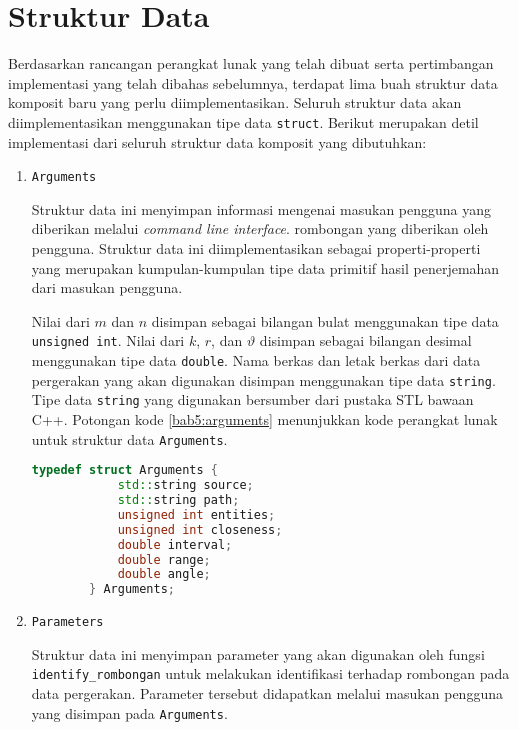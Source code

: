 \section{Struktur Data}
\label{sec:impl-struct}

Berdasarkan rancangan perangkat lunak yang telah dibuat serta pertimbangan implementasi yang telah dibahas sebelumnya, terdapat lima buah struktur data komposit baru yang perlu diimplementasikan. Seluruh struktur data akan diimplementasikan menggunakan tipe data \texttt{struct}. Berikut merupakan detil implementasi dari seluruh struktur data komposit yang dibutuhkan:



\begin{enumerate}
    \item \texttt{Arguments}
    
    Struktur data ini menyimpan informasi mengenai masukan pengguna yang diberikan melalui \textit{command line interface}. rombongan yang diberikan oleh pengguna. Struktur data ini diimplementasikan sebagai properti-properti yang merupakan kumpulan-kumpulan tipe data primitif hasil penerjemahan dari masukan pengguna.
    
    Nilai dari $m$ dan $n$ disimpan sebagai bilangan bulat menggunakan tipe data \texttt{unsigned int}. Nilai dari $k$, $r$, dan $\vartheta$ disimpan sebagai bilangan desimal menggunakan tipe data \texttt{double}. Nama berkas dan letak berkas dari data pergerakan yang akan digunakan disimpan menggunakan tipe data \texttt{string}. Tipe data \texttt{string} yang digunakan bersumber dari pustaka STL bawaan C++. Potongan kode \ref{bab5:arguments} menunjukkan kode perangkat lunak untuk struktur data \texttt{Arguments}. 
    
    \begin{lstlisting}[language=C++, caption=Implementasi \texttt{Arguments}, label={bab5:arguments}]
        typedef struct Arguments {
            std::string source;
            std::string path;
            unsigned int entities;
            unsigned int closeness;
            double interval;
            double range;
            double angle;
        } Arguments;
    \end{lstlisting}
    
    \item \texttt{Parameters}
    
    Struktur data ini menyimpan parameter yang akan digunakan oleh fungsi \texttt{identify\_rombongan} untuk melakukan identifikasi terhadap rombongan pada data pergerakan. Parameter tersebut didapatkan melalui masukan pengguna yang disimpan pada \texttt{Arguments}.
    

\end{enumerate}
